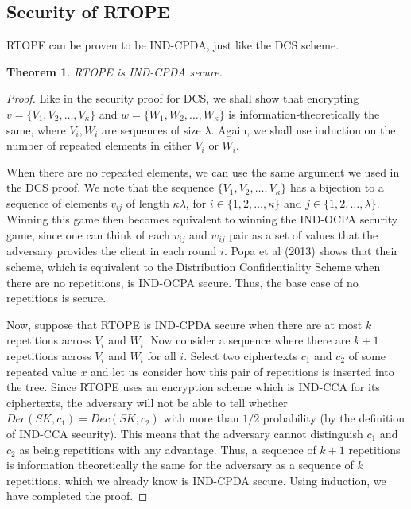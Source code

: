 \documentclass[12pt]{article}
\newtheorem{theorem}{Theorem}
\begin{document}
  \subsection{Security of RTOPE}

  RTOPE can be proven to be IND-CPDA, just like the DCS scheme. \\

  \begin{theorem}
    RTOPE is IND-CPDA secure.
  \end{theorem}
  \begin{proof}
    Like in the security proof for DCS, we shall show that encrypting $v = \{V_1, V_2, \ldots, V_{\kappa} \}$ and $w = \{W_1, W_2, \ldots, W_{\kappa}\}$ is information-theoretically the same, where $V_i, W_i$ are sequences of size $\lambda$. Again, we shall use induction on the number of repeated elements in either $V_i$ or $W_i$. 

When there are no repeated elements, we can use the same argument we used in the DCS proof. We note that the sequence $\{V_1, V_2, \ldots, V_{\kappa} \}$ has a bijection to a sequence of elements $v_{ij}$ of length $\kappa \lambda$, for $i \in \{1, 2, \ldots, \kappa\}$ and $j \in \{1, 2, \ldots, \lambda \}$. Winning this game then becomes equivalent to winning the IND-OCPA security game, since one can think of each $v_{ij}$ and $w_{ij}$ pair as a set of values that the adversary provides the client in each round $i$. Popa et al (2013) shows that their scheme, which is equivalent to the Distribution Confidentiality Scheme when there are no repetitions, is IND-OCPA secure. Thus, the base case of no repetitions is secure.

Now, suppose that RTOPE is IND-CPDA secure when there are at most $k$ repetitions across $V_i$ and $W_i$. Now consider a sequence where there are $k+1$ repetitions across $V_i$ and $W_i$ for all $i$. Select two ciphertexts $c_1$ and $c_2$ of some repeated value $x$ and let us consider how this pair of repetitions is inserted into the tree. Since RTOPE uses an encryption scheme which is IND-CCA for its ciphertexts, the adversary will not be able to tell whether $Dec(SK, c_1) = Dec(SK, c_2)$ with more than $1/2$ probability (by the definition of IND-CCA security). This means that the adversary cannot distinguish $c_1$ and $c_2$ as being repetitions with any advantage. Thus, a sequence of $k+1$ repetitions is information theoretically the same for the adversary as a sequence of $k$ repetitions, which we already know is IND-CPDA secure. Using induction, we have completed the proof.
  \end{proof}
\end{document}
